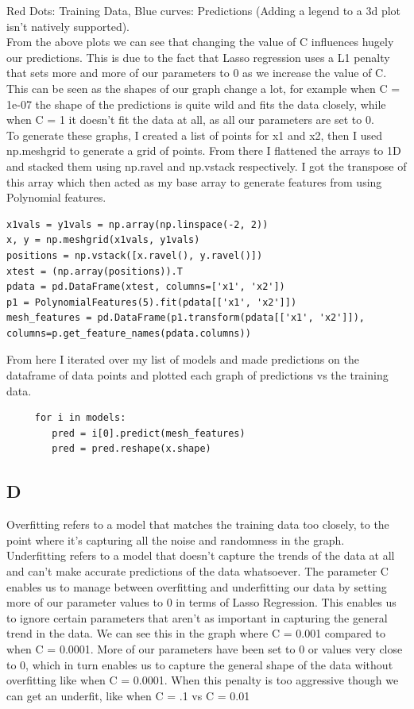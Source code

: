 \documentclass[11pt]{article} %
\begin{document}
 Red Dots: Training Data, Blue curves: Predictions (Adding a legend to a 3d plot isn't natively supported).\\
 From the above plots we can see that changing the value of C influences hugely our predictions. This is due to the fact that Lasso regression uses a L1 penalty that sets more and more of our parameters to 0 as we increase the value of C. This can be seen as the shapes of our graph change a lot, for example when C = 1e-07 the shape of the predictions is quite wild and fits the data closely, while when C = 1 it doesn't fit the data at all, as all our parameters are set to 0.
 \\
 To generate these graphs, I created a list of points for x1 and x2, then I used np.meshgrid to generate a grid of points. From there I flattened the arrays to 1D and stacked them using np.ravel and np.vstack respectively. I got the transpose of this array which then acted as my base array to generate features from using Polynomial features.
 \begin{verbatim}
x1vals = y1vals = np.array(np.linspace(-2, 2))
x, y = np.meshgrid(x1vals, y1vals)
positions = np.vstack([x.ravel(), y.ravel()])
xtest = (np.array(positions)).T
pdata = pd.DataFrame(xtest, columns=['x1', 'x2'])
p1 = PolynomialFeatures(5).fit(pdata[['x1', 'x2']])
mesh_features = pd.DataFrame(p1.transform(pdata[['x1', 'x2']]), columns=p.get_feature_names(pdata.columns))
 \end{verbatim}
 From here I iterated over my list of models and made predictions on the dataframe of data points and plotted each graph of predictions vs the training data.
 \begin{verbatim}
     for i in models:
        pred = i[0].predict(mesh_features)
        pred = pred.reshape(x.shape)
 \end{verbatim}
 \subsection{D}
 Overfitting refers to a model that matches the training data too closely, to the point where it's capturing all the noise and randomness in the graph. Underfitting refers to a model that doesn't capture the trends of the data at all and can't make accurate predictions of the data whatsoever. The parameter C enables us to manage between overfitting and underfitting our data by setting more of our parameter values to 0 in terms of Lasso Regression. This enables us to ignore certain parameters that aren't as important in capturing the general trend in the data. We can see this in the graph where C = 0.001 compared to when C = 0.0001. More of our parameters have been set to 0 or values very close to 0, which in turn enables us to capture the general shape of the data without overfitting like when C = 0.0001. When this penalty is too aggressive though we can get an underfit, like when C = .1 vs C = 0.01
 
\end{document}
